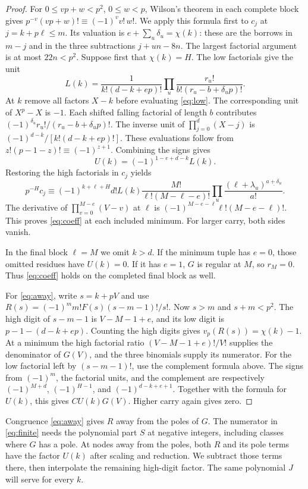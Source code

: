 \documentclass[11pt]{article}
\newcommand{\ff}[2]{#1^{\underline{#2}}}
\newcommand{\val}{v_p}
\begin{document}
\begin{proof}
For $0\le vp+w<p^2$, $0\le w<p$, Wilson's theorem in each complete
block gives $p^{-v}(vp+w)!\equiv(-1)^v v!\,w!$. We apply this formula
first to $c_j$ at $j=k+p\ell\le m$. Its valuation is
$e+\sum_u\delta_u=\chi(k)$: these are the borrows in $m-j$ and in the
three subtractions $j+un-8n$. The largest factorial argument is at
most $22n<p^2$. Suppose first that $\chi(k)=H$. The low factorials
give the unit
\[
 L(k)=\frac{1}{k!(d-k+ep)!}
       \prod_u\frac{r_u!}{b!(r_u-b+\delta_up)!}.
\]
At $k$ remove all factors $X-k$ before evaluating \eqref{eq:low}.
The corresponding unit of $X^p-X$ is $-1$. Each shifted falling
factorial of length $b$ contributes
$(-1)^{\delta_u}r_u!/(r_u-b+\delta_up)!$.
The inverse unit of $\prod_{j=0}^d(X-j)$ is
$(-1)^{d-k}/[k!(d-k+ep)!]$. These evaluations follow from
$z!(p-1-z)!\equiv(-1)^{z+1}$. Combining the signs gives
\[
 U(k)=(-1)^{1-e+d-k}L(k).
\]
Restoring the high factorials in $c_j$ yields
\[
 p^{-H}c_j\equiv
 (-1)^{k+\ell+H}d!L(k)\frac{M!}{\ell!(M-\ell-e)!}
      \prod_u\frac{\ff{(\ell+\lambda_u)}{a+\delta_u}}{a!}.
\]
The derivative of $\prod_{v=0}^{M-e}(V-v)$ at $\ell$ is
$(-1)^{M-e-\ell}\ell!(M-e-\ell)!$. This proves \eqref{eq:coeff}
at each included minimum. For larger carry, both sides vanish.

In the final block $\ell=M$ we omit $k>d$. If the minimum tuple
has $e=0$, those omitted residues have $U(k)=0$. If it has $e=1$,
$G$ is regular at $M$, so $r_M=0$. Thus \eqref{eq:coeff} holds on
the completed final block as well.

For \eqref{eq:away}, write $s=k+pV$ and use
$R(s)=(-1)^m m!F(s)(s-m-1)!/s!$. Now $s>m$ and $s+m<p^2$.
The high digit of $s-m-1$ is $V-M-1+e$, and its low digit is
$p-1-(d-k+ep)$. Counting the high digits gives
$\val(R(s))=\chi(k)-1$. At a minimum the high factorial ratio
$(V-M-1+e)!/V!$ supplies the denominator of $G(V)$, and the three
binomials supply its numerator. For the low factorial left by
$(s-m-1)!$, use the complement formula above. The signs from
$(-1)^m$, the factorial units, and the complement are respectively
$(-1)^{M+d}$, $(-1)^{H-1}$, and $(-1)^{d-k+e+1}$.
Together with the formula for $U(k)$, this gives $C U(k)G(V)$.
Higher carry again gives zero.
\end{proof}

Congruence \eqref{eq:away} gives $R$ away from the poles of $G$.
The numerator in \eqref{eq:finite} needs the polynomial part $S$ at
negative integers, including classes where $G$ has a pole. At nodes
away from the poles, both $R$ and its pole terms have the factor
$U(k)$ after scaling and reduction. We subtract those terms there,
then interpolate the remaining high-digit factor. The same polynomial
$J$ will serve for every $k$.
\end{document}
